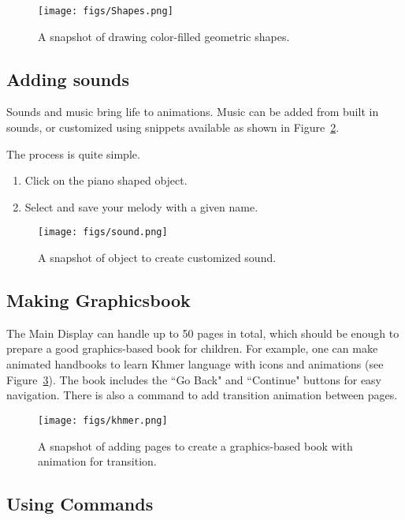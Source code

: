 \begin{figure}
\centering
\texttt{[image: figs/Shapes.png]}
\caption{A snapshot of drawing color-filled geometric shapes.}
\label{fig:Geometric Shapes Painting}
\end{figure}

\newpage
\subsection{Adding sounds}

Sounds and music bring life to animations. Music can be added from built in sounds,  or customized using snippets available as shown in Figure~\ref{fig:Making your own Melody Music}. 

The process is quite simple. 

\begin{enumerate}
	\item Click on the piano shaped object.
	\item Select and save your melody with a given name.
\end{enumerate}
\begin{figure}
\centering
\texttt{[image: figs/sound.png]}
\caption{A snapshot of object to create customized sound.}
\label{fig:Making your own Melody Music}
\end{figure}

\subsection{Making Graphicsbook}

The Main Display can handle up to 50 pages in total, which should be enough to prepare a good graphics-based book for children. For example, one can make animated handbooks to learn Khmer language with icons and animations (see Figure~\ref{fig:Khmer Learning with page transition}). The book includes the “Go Back" and “Continue" buttons for easy navigation. There is also a command to add transition animation between pages.

\begin{figure}
\centering
\texttt{[image: figs/khmer.png]}
\caption{A snapshot of adding pages to create a graphics-based book with animation for transition.}
\label{fig:Khmer Learning with page transition}
\end{figure}

\subsection{Using Commands}

